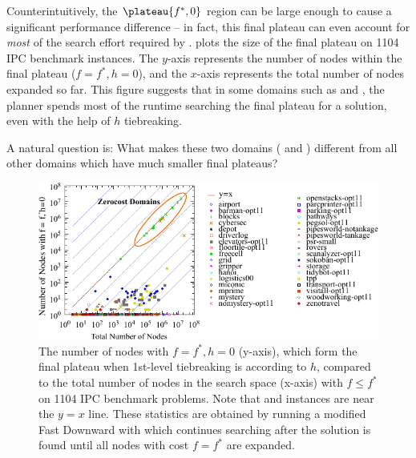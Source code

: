 Counterintuitively, the $\plateau{f^*, 0}$ region can be large enough to
cause a significant performance difference -- in fact, this final plateau can even account for \emph{most} of the
search effort required by \astar.
 plots the size of the final plateau on 1104 IPC
benchmark instances.  The $y$-axis represents the number of nodes within
the final plateau ($f=f^*, h=0$), and the $x$-axis represents the total
number of nodes expanded so far. This figure suggests that in some
domains such as  and , the planner
spends most of the runtime searching the final plateau for a solution,
even with the help of $h$ tiebreaking.

A natural question is:  What makes these two domains
( and )  different from all other domains
which have much smaller final plateaus?

\begin{figure}[htbp]
   \centering
  \includegraphics[width=\linewidth]{tables/aaai16-frontier/aaai16prelim3/lmcut_frontier-front.pdf}
  \caption{
 The number of nodes with $f=f^*, h=0$ (y-axis), which form
  the final plateau when 1st-level tiebreaking is according to $h$, compared to
  the total number of nodes in the search space (x-axis) with $f\leq
  f^*$ on 1104 IPC benchmark problems.  Note that 
  and  instances are near the $y=x$ line.
  These statistics are obtained by running a modified Fast Downward with
 \lmcut which continues searching after the solution is found
 until all nodes with cost $f=f^*$ are expanded.} \label{fig:plateau}
\end{figure}

